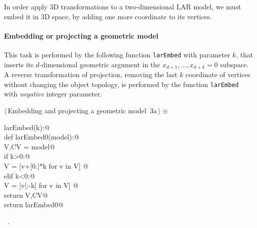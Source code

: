 \documentclass[11pt,oneside]{article}	%
\begin{document}
In order apply 3D transformations to a two-dimensional LAR model, we must embed it in 3D space, by adding one more coordinate to its vertices. 

\paragraph{Embedding or projecting a geometric model}

This task is performed by the following function \texttt{larEmbed} with parameter $k$, that inserts its $d$-dimensional geometric argument in the $x_{d+1}, \ldots, x_{d+k}=0$ subspace.
A reverse transformation of projection, removing the last $k$ coordinate of vertices without changing the object topology, is performed by the function \texttt{larEmbed} with \emph{negative} integer parameter.


\begin{flushleft} \small \label{scrap4}
\protect{}$\langle\,$Embedding and projecting a geometric model\nobreak\ {\footnotesize 3a}$\,\rangle\equiv$
\vspace{-1ex}
\begin{list}{}{} \item
\mbox{}\verb@def larEmbed(k):@\\
\mbox{}\verb@   def larEmbed0(model):@\\
\mbox{}\verb@      V,CV = model@\\
\mbox{}\verb@      if k>0:@\\
\mbox{}\verb@         V = [v+[0.]*k for v in V] @\\
\mbox{}\verb@      elif k<0:@\\
\mbox{}\verb@         V = [v[:-k] for v in V] @\\
\mbox{}\verb@      return V,CV@\\
\mbox{}\verb@   return larEmbed0@\\
\mbox{}\verb@@{\NWsep}
\end{list}
\vspace{-1ex}
\footnotesize\addtolength{\baselineskip}{-1ex}
\begin{list}{}{\setlength{\itemsep}{-\parsep}\setlength{\itemindent}{-\leftmargin}}
\item \NWtxtMacroRefIn\ .
\end{list}
\end{flushleft}
\end{document}
